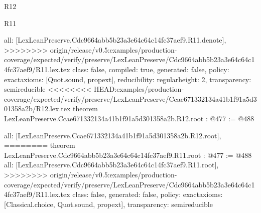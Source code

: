 \begin{lexlean}{R12}
\begin{lexlean}{R11}
\begin{coremodule}
{{{{{  all: [LexLeanPreserve.Cdc9664abb5b23a3e64c64c14fc37aef9.R11.denote],
>>>>>>>> origin/release/v0.5:examples/production-coverage/expected/verify/preserve/LexLeanPreserve/Cdc9664abb5b23a3e64c64c14fc37aef9/R11.lex.tex
  class: false,
  compiled: true,
  generated: false,
  policy: exact{axioms: [Quot.sound, propext]},
  reducibility: regular{height: 2},
  transparency: semireducible
}
<<<<<<<< HEAD:examples/production-coverage/expected/verify/preserve/LexLeanPreserve/Ccae671332134a41b1f91a5d301358a2b/R12.lex.tex
theorem LexLeanPreserve.Ccae671332134a41b1f91a5d301358a2b.R12.root : @477 := @488 {
  all: [LexLeanPreserve.Ccae671332134a41b1f91a5d301358a2b.R12.root],
========
theorem LexLeanPreserve.Cdc9664abb5b23a3e64c64c14fc37aef9.R11.root : @477 := @488 {
  all: [LexLeanPreserve.Cdc9664abb5b23a3e64c64c14fc37aef9.R11.root],
>>>>>>>> origin/release/v0.5:examples/production-coverage/expected/verify/preserve/LexLeanPreserve/Cdc9664abb5b23a3e64c64c14fc37aef9/R11.lex.tex
  class: false,
  generated: false,
  policy: exact{axioms: [Classical.choice, Quot.sound, propext]},
  transparency: semireducible
}

}}}}}
\end{coremodule}
\end{lexlean}
\end{lexlean}
